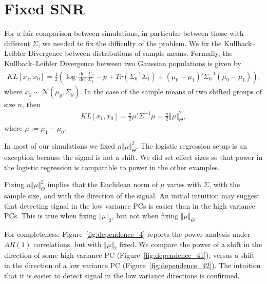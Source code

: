 \documentclass[]{bio}
\begin{document}
\section{Fixed SNR}
\label{sec:fix_snr}

For a fair comparison between simulations, in particular between those with different $\Sigma$, we needed to fix the difficulty of the problem.
We fix the Kullback–Leibler Divergence between distributions of sample means. 
Formally, the Kullback–Leibler Divergence between two Gaussian populations is given by 
\begin{align}
\label{eq:KLD}
KL[x_1,x_0]=\frac{1}{2}\left(
\log \frac{\det \Sigma_0}{\det \Sigma_1}-p+Tr(\Sigma_0^{-1}\Sigma_1)+(\mu_0-\mu_1)'\Sigma^{-1}_0(\mu_0-\mu_1)
\right),
\end{align}
where $x_y\sim\mathcal{N}(\mu_y,\Sigma_y)$.
In the case of the sample means of two shifted groups of size $n$, then 
\begin{align}
\label{eq:mahalanobis}
KL[\bar x_1,\bar x_0]=
\frac{n}{2}\mu'\Sigma^{-1}\mu=
\frac{n}{2}\Vert \mu \Vert_\Theta^2,
\end{align}
where $\mu:=\mu_1-\mu_0$. 

In most of our simulations we fixed $n \Vert \mu \Vert_\Theta^2$. 
The logistic regression setup is an exception because the signal is not a shift. 
We did set effect sizes so that power in the logistic regression is comparable to power in the other examples.

Fixing $n \Vert \mu \Vert_\Theta^2$ implies that the Euclidean norm of $\mu$ varies with $\Sigma$, with the sample size, and with the direction of the signal.
An initial intuition may suggest that detecting signal in the low variance PCs is easier than in the high variance PCs. 
This is true when fixing $\Vert \mu \Vert_2$, but not when fixing $\Vert \mu \Vert_{\Theta}$.

For completeness, Figure~\ref{fig:dependence_4} reports the power analysis under $AR(1)$ correlations, but with $\Vert \mu \Vert_2$ fixed.
We compare the power of a shift in the direction of some high variance PC (Figure~\ref{fig:dependence_41}), versus a shift in the direction of a low variance PC (Figure~\ref{fig:dependence_42}).
The intuition that it is easier to detect signal in the low variance directions is confirmed. 
\end{document}
